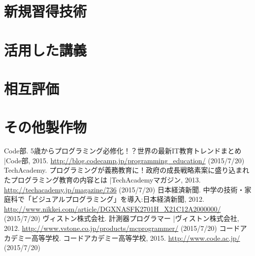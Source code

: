 \documentclass[openany,11pt,papersize]{jsbook}
\begin{document}
\begin{appendix}

\chapter{新規習得技術}

\chapter{活用した講義}

\chapter{相互評価}

\chapter{その他製作物}

\end{appendix}



\begin{thebibliography}{9}
  Code部. 5歳からプログラミング必修化！？世界の最新IT教育トレンドまとめ |Code部,  2015. \url{http://blog.codecamp.jp/programming_education/} (2015/7/20)
  TechAcademy. プログラミングが義務教育に！政府の成長戦略素案に盛り込まれたプログラミング教育の内容とは |TechAcademyマガジン,  2013. \url{http://techacademy.jp/magazine/736} (2015/7/20)
  日本経済新聞. 中学の技術・家庭科で「ビジュアルプログラミング」を導入:日本経済新聞,  2012. \url{http://www.nikkei.com/article/DGXNASFK2701H_X21C12A2000000/} (2015/7/20)
  ヴィストン株式会社. 計測器プログラマー |ヴィストン株式会社,  2012. \url{http://www.vstone.co.jp/products/mcprogrammer/} (2015/7/20)
   コードアカデミー高等学校. コードアカデミー高等学校,  2015. \url{http://www.code.ac.jp/} (2015/7/20)
\end{thebibliography}
\end{document}

